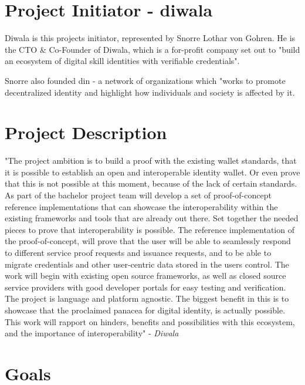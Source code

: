 \section{Project Initiator - \gls{diwala}}

Diwala is this projects initiator, represented by Snorre Lothar von Gohren. He is the CTO \& Co-Founder of Diwala, which is a for-profit company set out to "build an ecosystem of digital skill identities with verifiable credentials"\cite{DiwalaAbout}.

Snorre also founded \acrfull{din} - a network of organizations which "works to promote decentralized identity and highlight how individuals and society is affected by it.

\section{Project Description}

"The project ambition is to build a proof with the existing wallet standards, that it is possible to establish an open and interoperable identity wallet. Or even prove that this is not possible at this moment, because of the lack of certain standards. As part of the bachelor project team will develop a set of proof-of-concept reference implementations that can showcase the interoperability within the existing frameworks and tools that are already out there. Set together the needed pieces to prove that interoperability is possible. The reference implementation of the proof-of-concept, will prove that the user will be able to seamlessly respond to different service proof requests and issuance requests, and to be able to migrate credentials and other user-centric data stored in the users control. The work will begin with existing open source frameworks, as well as closed source service providers with good developer portals for easy testing and verification. The project is language and platform agnostic. The biggest benefit in this is to showcase that the proclaimed panacea for digital identity, is actually possible. This work will rapport on hinders, benefits and possibilities with this ecosystem, and the importance of interoperability" \cite{ProjectDescription} - \textit{Diwala}






\section{Goals}

